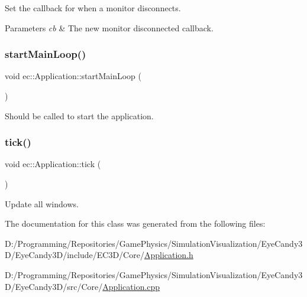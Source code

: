 Set the callback for when a monitor disconnects. 


\begin{DoxyParams}{Parameters}
{\em cb} & The new monitor disconnected callback. \\
\hline
\end{DoxyParams}
\mbox{\label{classec_1_1_application_ad541044a8fc0ff8d6c3fc57220109a50}} 
\subsubsection{\texorpdfstring{start\+Main\+Loop()}{startMainLoop()}}
{\footnotesize\ttfamily void ec\+::\+Application\+::start\+Main\+Loop (\begin{DoxyParamCaption}{ }\end{DoxyParamCaption})\hspace{0.3cm}{\ttfamily [virtual]}}



Should be called to start the application. 

\mbox{\label{classec_1_1_application_a036ae53bcbf708c7a01deb199feeccdf}} 
\subsubsection{\texorpdfstring{tick()}{tick()}}
{\footnotesize\ttfamily void ec\+::\+Application\+::tick (\begin{DoxyParamCaption}{ }\end{DoxyParamCaption})\hspace{0.3cm}{\ttfamily [virtual]}}



Update all windows. 



The documentation for this class was generated from the following files\+:\begin{DoxyCompactItemize}
\item 
D\+:/\+Programming/\+Repositories/\+Game\+Physics/\+Simulation\+Visualization/\+Eye\+Candy3\+D/\+Eye\+Candy3\+D/include/\+E\+C3\+D/\+Core/\mbox{\hyperlink{_application_8h}{Application.\+h}}\item 
D\+:/\+Programming/\+Repositories/\+Game\+Physics/\+Simulation\+Visualization/\+Eye\+Candy3\+D/\+Eye\+Candy3\+D/src/\+Core/\mbox{\hyperlink{_application_8cpp}{Application.\+cpp}}\end{DoxyCompactItemize}
